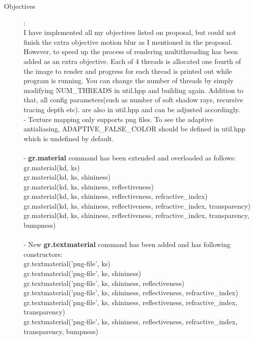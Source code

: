 \documentclass {article}
\begin{document}
\begin{description}
\item[Objectives]:\\
I have implemented all my objectives listed on proposal, but could not finish the extra objective motion blur as I mentioned in the proposal. However, to speed up the process
of rendering multithreading has been added as an extra objective. Each of 4 threads is allocated one fourth of the image to render and progress for each thread is printed out while
program is running. You can change the number of threads by simply modifying NUM\_THREADS in util.hpp and building again. Addition to that, all config parameters(such as number of soft shadow
rays, recursive tracing depth etc). are also in util.hpp and can be adjusted accordingly. \\
- Texture mapping only supports png files. To see the adaptive antialiasing, ADAPTIVE\_FALSE\_COLOR should be defined in util.hpp which is undefined by default.\\\\
- {\bf gr.material} command has been extended and overloaded as follows:\\
gr.material(kd, ks) \\
gr.material(kd, ks, shininess) \\
gr.material(kd, ks, shininess, reflectiveness) \\
gr.material(kd, ks, shininess, reflectiveness, refractive\_index) \\
gr.material(kd, ks, shininess, reflectiveness, refractive\_index, transparency) \\
gr.material(kd, ks, shininess, reflectiveness, refractive\_index, transparency, bumpness) \\\\
- New {\bf gr.textmaterial} command has been added and has following constructors: \\
gr.textmaterial('png-file', ks) \\
gr.textmaterial('png-file', ks, shininess) \\
gr.textmaterial('png-file', ks, shininess, reflectiveness) \\
gr.textmaterial('png-file', ks, shininess, reflectiveness, refractive\_index) \\
gr.textmaterial('png-file', ks, shininess, reflectiveness, refractive\_index, transparency) \\
gr.textmaterial('png-file', ks, shininess, reflectiveness, refractive\_index, transparency, bumpness) \\\\

\end{description}
\end{document}
